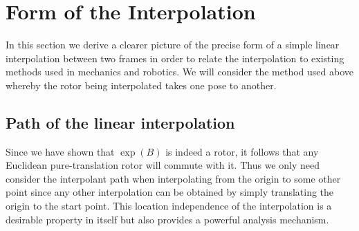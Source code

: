 
\section{Form of the Interpolation}

In this section we derive a clearer picture of the precise form of
a simple linear interpolation between two frames in order to relate the 
interpolation to existing methods used in mechanics and robotics. We will consider
the method used above whereby the rotor being interpolated takes one pose to another.

\subsection{Path of the linear interpolation}

Since we have shown that $\exp(B)$ is indeed a rotor, it follows that any
Euclidean pure-translation rotor will commute with it. Thus we only need consider the
interpolant path when interpolating from the origin to some other point since
any other interpolation can be obtained by simply translating the origin to
the start point. This location independence of the interpolation is a 
desirable property in itself but also provides a powerful analysis mechanism.

